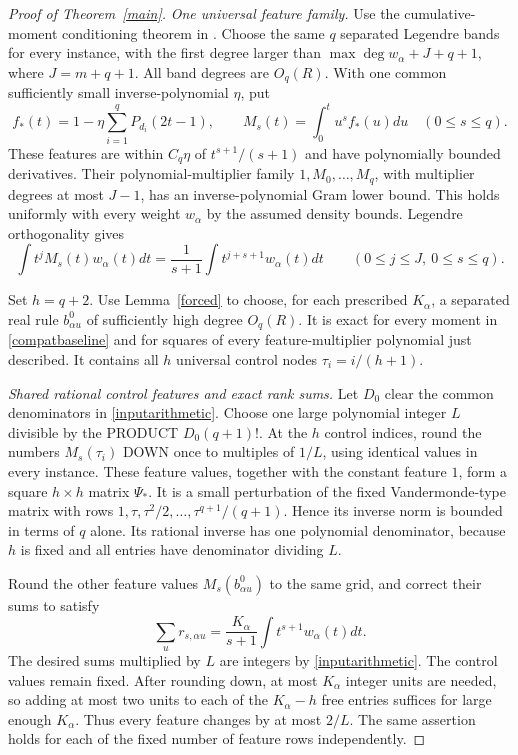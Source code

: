 \documentclass[11pt]{article}
\begin{document}
\begin{proof}[Proof of Theorem~\ref{main}]
\emph{One universal feature family.}
Use the cumulative-moment conditioning theorem in
.
Choose the same $q$ separated Legendre bands for every instance, with
the first degree larger than $\max\deg w_\alpha+J+q+1$, where
$J=m+q+1$. All band degrees are $O_q(R)$.
With one common sufficiently small inverse-polynomial $\eta$, put
\[
 f_*(t)=1-\eta\sum_{i=1}^qP_{d_i}(2t-1),\qquad
 M_s(t)=\int_0^t u^s f_*(u)du\quad(0\le s\le q).
\]
These features are within $C_q\eta$ of $t^{s+1}/(s+1)$ and have
polynomially bounded derivatives. Their polynomial-multiplier family
$1,M_0,\ldots,M_q$, with multiplier degrees at most $J-1$, has an
inverse-polynomial Gram lower bound. This holds uniformly with every
weight $w_\alpha$ by the assumed density bounds.
Legendre orthogonality gives
\begin{equation}\label{compatbaseline}
 \int t^j M_s(t)w_\alpha(t)dt
  =\frac1{s+1}\int t^{j+s+1}w_\alpha(t)dt
       \qquad(0\le j\le J,\ 0\le s\le q).
\end{equation}

Set $h=q+2$. Use Lemma~\ref{forced} to choose, for each prescribed
$K_\alpha$, a separated real rule $b^0_{\alpha u}$ of sufficiently high
degree $O_q(R)$. It is exact for every moment in
\eqref{compatbaseline} and for squares of every feature-multiplier
polynomial just described. It contains all $h$ universal control nodes
$\tau_i=i/(h+1)$.

\emph{Shared rational control features and exact rank sums.}
Let $D_0$ clear the common denominators in \eqref{inputarithmetic}.
Choose one large polynomial integer $L$ divisible by the PRODUCT
$D_0(q+1)!$. At the $h$
control indices, round the numbers $M_s(\tau_i)$ DOWN once to multiples
of $1/L$, using identical values in every instance. These feature
values, together with the constant feature $1$, form a square
$h\times h$ matrix $\Psi_*$. It is a small perturbation of the fixed
Vandermonde-type matrix with rows
$1,\tau,\tau^2/2,\ldots,\tau^{q+1}/(q+1)$.
Hence its inverse norm is bounded in terms of $q$ alone. Its rational
inverse has one polynomial denominator, because $h$ is fixed and all
entries have denominator dividing $L$.

Round the other feature values $M_s(b^0_{\alpha u})$ to the same grid,
and correct their sums to satisfy
\[
 \sum_u r_{s,\alpha u}
 =\frac{K_\alpha}{s+1}\int t^{s+1}w_\alpha(t)dt.
\]
The desired sums multiplied by $L$ are integers by
\eqref{inputarithmetic}. The control values remain fixed. After
rounding down, at most $K_\alpha$ integer units are needed, so adding
at most two units to each of the $K_\alpha-h$ free entries suffices
for large enough $K_\alpha$. Thus every feature changes by at most
$2/L$. The same assertion holds for each of the fixed number of
feature rows independently.


\end{proof}
\end{document}
